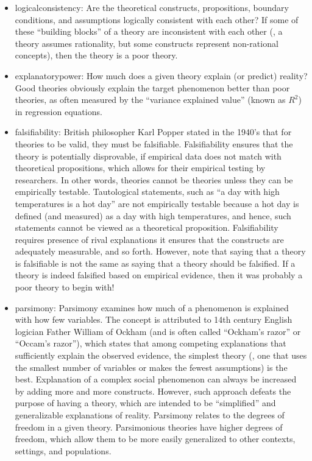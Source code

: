 \begin{itemize}

	\item \Gls{logicalconsistency}: Are the theoretical constructs, propositions, boundary conditions, and assumptions logically consistent with each other? If some of these ``building blocks'' of a theory are inconsistent with each other (\eg, a theory assumes rationality, but some constructs represent non-rational concepts), then the theory is a poor theory.

	\item \Gls{explanatorypower}: How much does a given theory explain (or predict) reality? Good theories obviously explain the target phenomenon better than poor theories, as often measured by the ``variance explained value'' (known as $ R^2 $) in regression equations.

	\item \Gls{falsifiability}: British philosopher Karl Popper stated in the 1940's that for theories to be valid, they must be falsifiable. Falsifiability ensures that the theory is potentially disprovable, if empirical data does not match with theoretical propositions, which allows for their empirical testing by researchers. In other words, theories cannot be theories unless they can be empirically testable. Tautological statements, such as ``a day with high temperatures is a hot day'' are not empirically testable because a hot day is defined (and measured) as a day with high temperatures, and hence, such statements cannot be viewed as a theoretical proposition. Falsifiability requires presence of rival explanations it ensures that the constructs are adequately measurable, and so forth. However, note that saying that a theory is falsifiable is not the same as saying that a theory should be falsified. If a theory is indeed falsified based on empirical evidence, then it was probably a poor theory to begin with!

	\item \Gls{parsimony}: Parsimony examines how much of a phenomenon is explained with how few variables. The concept is attributed to 14th century English logician Father William of Ockham (and is often called ``Ockham's razor'' or ``Occam's razor''), which states that among competing explanations that sufficiently explain the observed evidence, the simplest theory (\ie, one that uses the smallest number of variables or makes the fewest assumptions) is the best. Explanation of a complex social phenomenon can always be increased by adding more and more constructs. However, such approach defeats the purpose of having a theory, which are intended to be ``simplified'' and generalizable explanations of reality. Parsimony relates to the degrees of freedom in a given theory. Parsimonious theories have higher degrees of freedom, which allow them to be more easily generalized to other contexts, settings, and populations.

\end{itemize}

